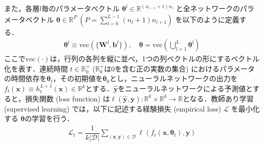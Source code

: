 また，各層$l$毎のパラメータベクトル $\bm{\theta}^l \in \mathbb{R}^{(n_{l-1}+1)n_l}$ と全ネットワークのパラメータベクトル $\bm{\theta} \in \mathbb{R}^P \ (P=\sum_{l=0}^{L-1}(n_{l}+1)n_{l+1})$ を以下のように定義する．
\begin{align}
    \bm{\theta}^{l} \equiv \mbox{vec}\left(\{\bm{W}^{l}, \bm{b}^{l}\}\right), \quad \bm{\theta} = \mbox{vec}\left(\bigcup_{l=1}^L \bm{\theta}^l\right)
\end{align}
ここで$\mbox{vec}(\cdot)$は，行列の各列を縦に並べ，1つの列ベクトルの形にするベクトル化を表す．連続時間 $t \in \mathbb{R}_0^{+}$ ($\mathbb{R}_0^{+}$は0を含む正の実数の集合)  におけるパラメータの時間依存を$\bm{\theta}_t$，その初期値を$\bm{\theta}_0$とし，ニューラルネットワークの出力を$f_t(\bm{x}) \equiv h_t^{L+1}(\bm{x}) \in \mathbb{R}^{k}$とする．$\hat{\bm{y}}$をニューラルネットワークによる予測値とすると，損失関数 (loss function) は$\ell (\hat{\bm{y}}, \bm{y}):\mathbb{R}^{k} \times \mathbb{R}^k \rightarrow \mathbb{R}$となる．教師あり学習 (supervised learning) では，以下に記述する経験損失 (empirical loss) $\mathcal{L}$ を最小化する $\bm{\theta}$の学習を行う．
\begin{align}
    \mathcal{L}_t = \dfrac{1}{k|\mathcal{D}|}\sum_{(\bm{x},\bm{y}) \in \mathcal{D}} \ell(f_t(\bm{x},\bm{\theta}_t), \bm{y})
\end{align}